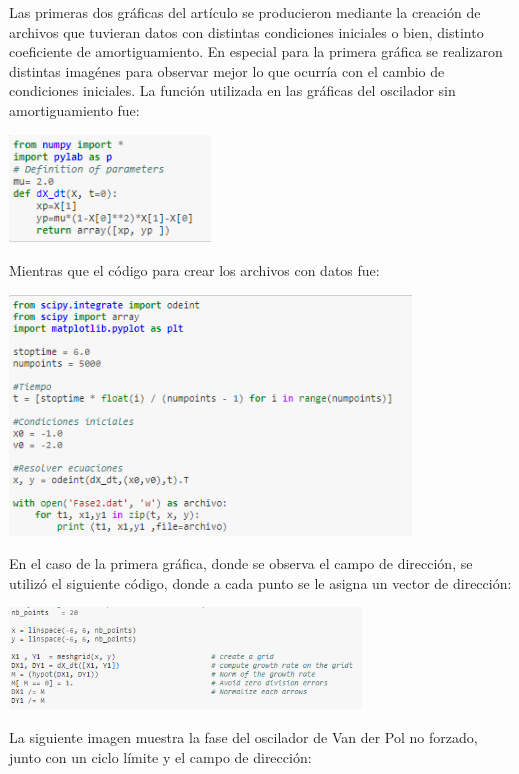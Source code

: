 \documentclass{article}
\begin{document}
Las primeras dos gráficas del artículo se producieron mediante la creación de archivos que tuvieran datos con distintas condiciones iniciales o bien, distinto coeficiente de amortiguamiento. En especial para la primera gráfica se realizaron distintas imagénes para observar mejor lo que ocurría con el cambio de condiciones iniciales.
La función utilizada en las gráficas del oscilador sin amortiguamiento fue:
\begin{center}
  \includegraphics[width=0.4\textwidth]{Funcion.PNG}
\end{center}
Mientras que el código para crear los archivos con datos fue:
\begin{center}
  \includegraphics[width=0.8\textwidth]{Archivos.PNG}
\end{center}
En el caso de la primera gráfica, donde se observa el campo de dirección, se utilizó el siguiente código, donde a cada punto se le asigna un vector de dirección:
\begin{center}
  \includegraphics[width=0.7\textwidth]{Malla.PNG}
\end{center}
La siguiente imagen muestra la fase del oscilador de Van der Pol no forzado, junto con un ciclo límite y el campo de dirección:
\end{document}
